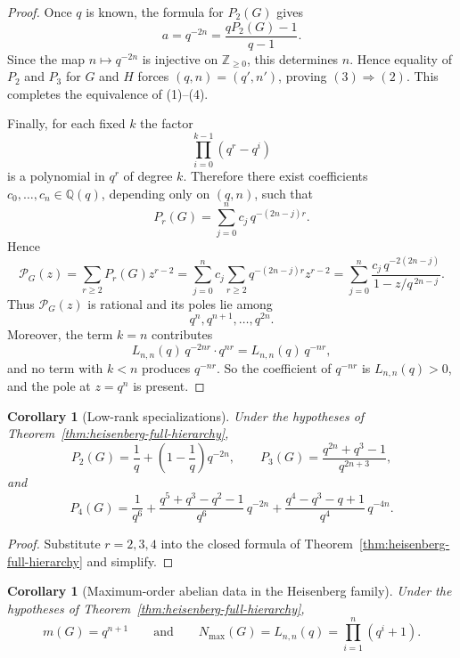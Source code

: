 \documentclass[11pt]{article}
\newtheorem{corollary}[theorem]{Corollary}
\theoremstyle{definition}
\theoremstyle{remark}
\theoremstyle{definition}
\theoremstyle{plain}
\begin{document}
\begin{proof}
Once $q$ is known, the formula for $P_2(G)$ gives
\[
a=q^{-2n}=\frac{qP_2(G)-1}{q-1}.
\]
Since the map $n\mapsto q^{-2n}$ is injective on $\mathbb Z_{\ge0}$, this determines $n$.
Hence equality of $P_2$ and $P_3$ for $G$ and $H$ forces $(q,n)=(q',n')$, proving $(3)\Rightarrow(2)$.
This completes the equivalence of (1)--(4).

Finally, for each fixed $k$ the factor
\[
\prod_{i=0}^{k-1}(q^r-q^i)
\]
is a polynomial in $q^r$ of degree $k$.
Therefore there exist coefficients $c_0,\dots,c_n\in \mathbb Q(q)$, depending only on $(q,n)$, such that
\[
P_r(G)=\sum_{j=0}^{n} c_j\,q^{-(2n-j)r}.
\]
Hence
\[
\mathcal P_G(z)
=
\sum_{r\ge2}P_r(G)z^{r-2}
=
\sum_{j=0}^{n} c_j\sum_{r\ge2}q^{-(2n-j)r}z^{r-2}
=
\sum_{j=0}^{n}\frac{c_j\,q^{-2(2n-j)}}{1-z/q^{\,2n-j}}.
\]
Thus $\mathcal P_G(z)$ is rational and its poles lie among
\[
q^n,q^{n+1},\dots,q^{2n}.
\]
Moreover, the term $k=n$ contributes
\[
L_{n,n}(q)\,q^{-2nr}\cdot q^{nr}=L_{n,n}(q)\,q^{-nr},
\]
and no term with $k<n$ produces $q^{-nr}$.
So the coefficient of $q^{-nr}$ is $L_{n,n}(q)>0$, and the pole at $z=q^n$ is present.
\end{proof}

\begin{corollary}[Low-rank specializations]\label{cor:heisenberg-low-rank}\label{cor:heisenberg-P2P3}\label{cor:heisenberg-P4}
Under the hypotheses of Theorem~\ref{thm:heisenberg-full-hierarchy},
\[
P_2(G)=\frac{1}{q}+\left(1-\frac{1}{q}\right)q^{-2n},
\qquad
P_3(G)=\frac{q^{2n}+q^3-1}{q^{2n+3}},
\]
and
\[
P_4(G)
=\frac{1}{q^6}+\frac{q^5+q^3-q^2-1}{q^6}\,q^{-2n}
+\frac{q^4-q^3-q+1}{q^4}\,q^{-4n}.
\]
\end{corollary}

\begin{proof}
Substitute $r=2,3,4$ into the closed formula of Theorem~\ref{thm:heisenberg-full-hierarchy} and simplify.
\end{proof}

\begin{corollary}[Maximum-order abelian data in the Heisenberg family]\label{cor:heisenberg-maxabelian}
Under the hypotheses of Theorem~\ref{thm:heisenberg-full-hierarchy},
\[
m(G)=q^{n+1}
\qquad\text{and}\qquad
N_{\max}(G)=L_{n,n}(q)=\prod_{i=1}^{n}(q^i+1).
\]
\end{corollary}
\end{document}
